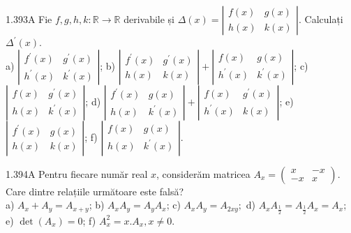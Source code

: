 \documentclass[11pt]{article}
\begin{document}
1.393A Fie $f, g, h, k: \mathbb{R} \rightarrow \mathbb{R}$ derivabile și $\Delta(x)=\left|\begin{array}{ll}f(x) & g(x) \\ h(x) & k(x)\end{array}\right|$. Calculați $\Delta^{\prime}(x)$.\\ a) $\left|\begin{array}{ll}f^{\prime}(x) & g^{\prime}(x) \\ h^{\prime}(x) & k^{\prime}(x)\end{array}\right|$; b) $\left|\begin{array}{ll}f^{\prime}(x) & g^{\prime}(x) \\ h(x) & k(x)\end{array}\right| + \left|\begin{array}{ll}f(x) & g(x) \\ h^{\prime}(x) & k^{\prime}(x)\end{array}\right|$; c) $\left|\begin{array}{ll}f(x) & g^{\prime}(x) \\ h(x) & k^{\prime}(x)\end{array}\right|$; d) $\left|\begin{array}{ll}f^{\prime}(x) & g(x) \\ h(x) & k^{\prime}(x)\end{array}\right| + \left|\begin{array}{ll}f(x) & g^{\prime}(x) \\ h^{\prime}(x) & k(x)\end{array}\right|$; e) $\left|\begin{array}{ll}f^{\prime}(x) & g(x) \\ h(x) & k(x)\end{array}\right|$; f) $\left|\begin{array}{ll}f(x) & g(x) \\ h(x) & k^{\prime}(x)\end{array}\right|$.


1.394A Pentru fiecare număr real $x$, considerăm matricea $A_{x}=\left(\begin{array}{cc}x & -x \\ -x & x\end{array}\right)$. Care dintre relațiile următoare este falsă?\\ a) $A_{x}+A_{y}=A_{x+y}$; b) $A_{x} A_{y}=A_{y} A_{x}$; c) $A_{x} A_{y}=A_{2 x y} ;$ d) $A_{x} A_{\frac{1}{2}}=A_{\frac{1}{2}} A_{x}=A_{x}$; e) $\operatorname{det}\left(A_{x}\right)=0$; f) $A_{x}^{2}=x . A_{x}, x \neq 0$.
\end{document}
